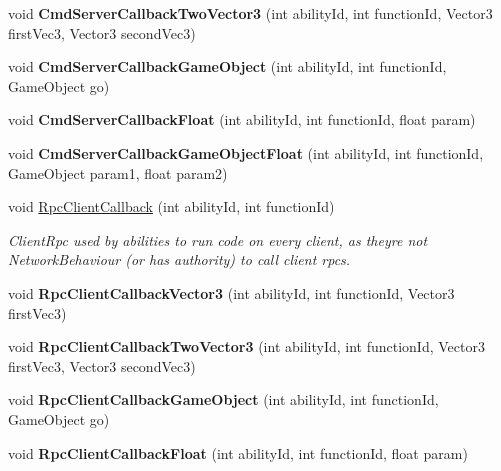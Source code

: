 \begin{DoxyCompactItemize}
void {\bfseries Cmd\+Server\+Callback\+Two\+Vector3} (int ability\+Id, int function\+Id, Vector3 first\+Vec3, Vector3 second\+Vec3)
\item 
\hypertarget{class_docking_a1a73fc7bf4e9dafa8a69f1eb1d95b878}{}\label{class_docking_a1a73fc7bf4e9dafa8a69f1eb1d95b878} 
void {\bfseries Cmd\+Server\+Callback\+Game\+Object} (int ability\+Id, int function\+Id, Game\+Object go)
\item 
\hypertarget{class_docking_a91b7225b18ce7cfba1ca0868e3d6bfff}{}\label{class_docking_a91b7225b18ce7cfba1ca0868e3d6bfff} 
void {\bfseries Cmd\+Server\+Callback\+Float} (int ability\+Id, int function\+Id, float param)
\item 
\hypertarget{class_docking_a54f8ea828b57cb70cb086ae626281e91}{}\label{class_docking_a54f8ea828b57cb70cb086ae626281e91} 
void {\bfseries Cmd\+Server\+Callback\+Game\+Object\+Float} (int ability\+Id, int function\+Id, Game\+Object param1, float param2)
\item 
void \hyperlink{class_docking_af5968322d054d0ed72908ffcd323fc65}{Rpc\+Client\+Callback} (int ability\+Id, int function\+Id)
\begin{DoxyCompactList}\small\item\em Client\+Rpc used by abilities to run code on every client, as they\textquotesingle{}re not Network\+Behaviour (or has authority) to call client rpcs. \end{DoxyCompactList}\item 
\hypertarget{class_docking_aad2c6156a2cf99dfe5f5bcaf197d6ef8}{}\label{class_docking_aad2c6156a2cf99dfe5f5bcaf197d6ef8} 
void {\bfseries Rpc\+Client\+Callback\+Vector3} (int ability\+Id, int function\+Id, Vector3 first\+Vec3)
\item 
\hypertarget{class_docking_ab91eeb98f1f4f2d2f5e57ace8017f2bd}{}\label{class_docking_ab91eeb98f1f4f2d2f5e57ace8017f2bd} 
void {\bfseries Rpc\+Client\+Callback\+Two\+Vector3} (int ability\+Id, int function\+Id, Vector3 first\+Vec3, Vector3 second\+Vec3)
\item 
\hypertarget{class_docking_a342f1eab0502869052ce0362959996b8}{}\label{class_docking_a342f1eab0502869052ce0362959996b8} 
void {\bfseries Rpc\+Client\+Callback\+Game\+Object} (int ability\+Id, int function\+Id, Game\+Object go)
\item 
\hypertarget{class_docking_a2b1f58a67ae1d560c4901cba7779fe1c}{}\label{class_docking_a2b1f58a67ae1d560c4901cba7779fe1c} 
void {\bfseries Rpc\+Client\+Callback\+Float} (int ability\+Id, int function\+Id, float param)
\item 

\end{DoxyCompactItemize}
